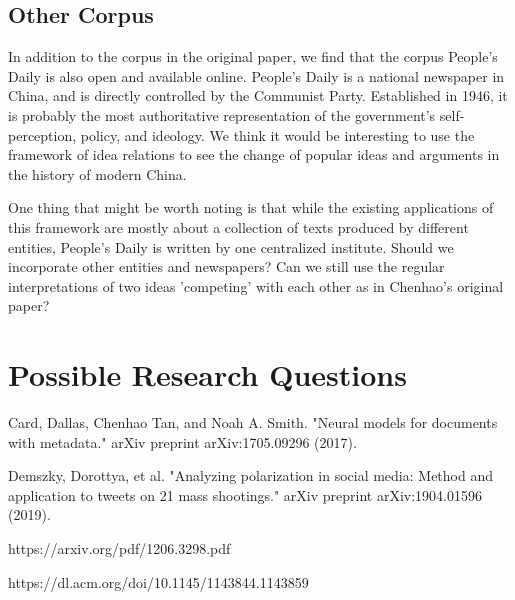 \documentclass{article}
\begin{document}
\subsection{Other Corpus}

In addition to the corpus in the original paper, we find that the corpus People's Daily is also open and available online. People's Daily is a national newspaper in China, and is directly controlled by the Communist Party. Established in 1946, it is probably the most authoritative representation of the government's self-perception, policy, and ideology. We think it would be interesting to use the framework of idea relations to see the change of popular ideas and arguments in the history of modern China. 

One thing that might be worth noting is that while the existing applications of this framework are mostly about a collection of texts produced by different entities, People's Daily is written by one centralized institute. Should we incorporate other entities and newspapers? Can we still use the regular interpretations of two ideas 'competing' with each other as in Chenhao's original paper?



\section{Possible Research Questions}







\begin{thebibliography}{999}
 
Card, Dallas, Chenhao Tan, and Noah A. Smith. "Neural models for documents with metadata." arXiv preprint arXiv:1705.09296 (2017).

Demszky, Dorottya, et al. "Analyzing polarization in social media: Method and application to tweets on 21 mass shootings." arXiv preprint arXiv:1904.01596 (2019).

https://arxiv.org/pdf/1206.3298.pdf

https://dl.acm.org/doi/10.1145/1143844.1143859
 
\end{thebibliography}
\end{document}
